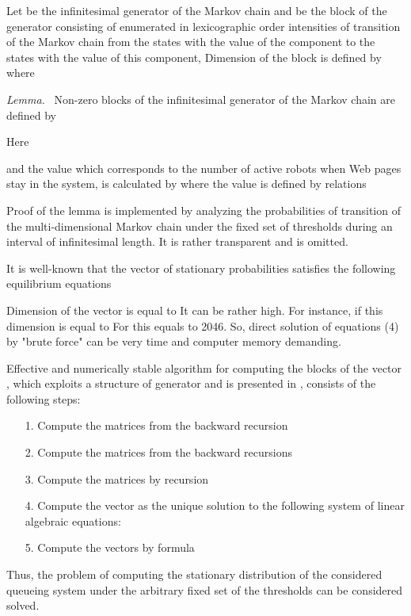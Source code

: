 \documentclass[11pt]{article}
\begin{document}
Let  be the infinitesimal generator of the Markov chain  and  be the block of the generator 
consisting of enumerated in lexicographic order intensities of
transition of the Markov chain  from the states
with the value  of the component  to the states with the
value  of this component,  Dimension of the block
 is defined by  where


 {\it Lemma.} ~Non-zero blocks  of the infinitesimal generator  of the Markov chain  are defined by





 Here



and the value  which corresponds to the number of active
robots when  Web pages stay in the system, is calculated by
 where the value  is defined by relations


 Proof of the lemma is implemented by analyzing the probabilities of
transition of the multi-dimensional Markov chain 
under the fixed set of  thresholds  during an
interval of infinitesimal length. It is rather transparent and is
omitted.

It is well-known that the vector  of stationary
probabilities satisfies the following equilibrium equations


Dimension of the vector  is equal to  It can be rather high. For instance, if
 this dimension is equal to  For 
this equals to 2046. So, direct solution of equations (4) by "brute
force" can be very time and computer memory demanding.

 Effective and
numerically stable algorithm for computing the blocks  of the vector , which exploits a
structure of generator  and is presented in \cite{kkod}, consists
of the following steps:
\begin{itemize}
\item[1.] Compute the matrices  from the
backward recursion

 
\item[2.] Compute the matrices  from the
backward recursions


\item[3.]
Compute the matrices  by recursion

\item[4.] Compute the vector  as the unique solution to the following system
of linear algebraic equations:

\item[5.] Compute the vectors  by
formula

\end{itemize}
Thus, the problem of computing the stationary distribution  of the considered queueing system under
the arbitrary fixed set of the   thresholds 
can be considered solved.
\end{document}
